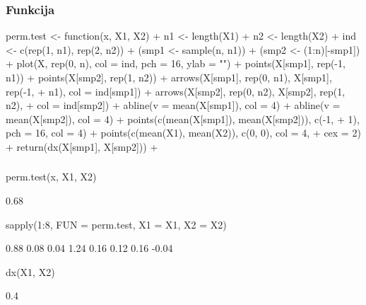\begin{frame}[fragile]
\frametitle{Funkcija}
\begin{Schunk}
\begin{Sinput}
 perm.test <- function(x, X1, X2) {
+     n1 <- length(X1)
+     n2 <- length(X2)
+     ind <- c(rep(1, n1), rep(2, n2))
+     (smp1 <- sample(n, n1))
+     (smp2 <- (1:n)[-smp1])
+     plot(X, rep(0, n), col = ind, pch = 16, ylab = "")
+     points(X[smp1], rep(-1, n1))
+     points(X[smp2], rep(1, n2))
+     arrows(X[smp1], rep(0, n1), X[smp1], rep(-1, 
+         n1), col = ind[smp1])
+     arrows(X[smp2], rep(0, n2), X[smp2], rep(1, n2), 
+         col = ind[smp2])
+     abline(v = mean(X[smp1]), col = 4)
+     abline(v = mean(X[smp2]), col = 4)
+     points(c(mean(X[smp1]), mean(X[smp2])), c(-1, 
+         1), pch = 16, col = 4)
+     points(c(mean(X1), mean(X2)), c(0, 0), col = 4, 
+         cex = 2)
+     return(dx(X[smp1], X[smp2]))
+ }
\end{Sinput}
\end{Schunk}
\end{frame}

\begin{frame}[fragile]
\frametitle{}

\begin{Schunk}
\begin{Sinput}
 perm.test(x, X1, X2)
\end{Sinput}
\begin{Soutput}
[1] 0.68
\end{Soutput}
\begin{Sinput}
 sapply(1:8, FUN = perm.test, X1 = X1, X2 = X2)
\end{Sinput}
\begin{Soutput}
[1]  0.88  0.08  0.04  1.24  0.16  0.12  0.16 -0.04
\end{Soutput}
\begin{Sinput}
 dx(X1, X2)
\end{Sinput}
\begin{Soutput}
[1] 0.4
\end{Soutput}
\end{Schunk}

\end{frame}












